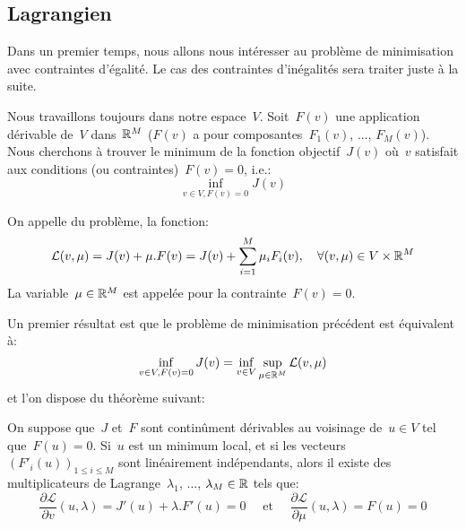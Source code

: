 \medskip
\subsection{Lagrangien}

Dans un premier temps, nous allons nous intéresser au problème de minimisation avec contraintes d'égalité. Le cas des contraintes d'inégalités sera traiter juste à la suite.

\medskip
\begin{definition}
Nous travaillons toujours dans notre espace~$V$.
Soit~$F(v)$ une application dérivable de~$V$ dans~$\mathbb R^M$ ($F(v)$ a pour composantes~$F_1(v)$, ..., $F_M(v)$).
Nous cherchons à trouver le minimum de la fonction objectif~$J(v)$ où~$v$ satisfait aux conditions (ou contraintes)~$F(v)=0$, i.e.:
\begin{equation}\label{Eq-LagEq}
\inf_{v\in V, F(v)=0} J(v)
\end{equation}

On appelle  du problème, la fonction:
\begin{equation}
\mathcal{L}(v,\mu) = J(v)+\mu.F(v) = J(v) + \displaystyle\sum_{i=1}^M \mu_iF_i(v), 
\quad \forall (v,\mu)\in V\times\mathbb R^M
\end{equation}
La variable~$\mu\in\mathbb R^M$ est appelée  pour la contrainte~$F(v)=0$.
\end{definition}

Un premier résultat est que le problème de minimisation précédent est équivalent à:
\begin{equation}
\inf_{v\in V, F(v)=0} J(v) = \inf_{v\in V} \sup_{\mu\in\mathbb R^M} \mathcal{L}(v,\mu)
\end{equation}
et l'on dispose du théorème suivant:
\begin{theoreme}
On suppose que~$J$ et~$F$ sont continûment dérivables au voisinage de~$u\in V$ tel que~$F(u)=0$. Si~$u$ est un minimum local, et si les vecteurs~$(F'_i(u))_{1\le i\le M}$ sont linéairement indépendants, alors il existe des multiplicateurs de Lagrange~$\lambda_1$, ..., $\lambda_M\in\mathbb R$ tels que:
\begin{equation}
\dfrac{\partial\mathcal{L}}{\partial v}(u,\lambda) = J'(u)+\lambda.F'(u)=0
\quad \text{ et }\quad
\dfrac{\partial\mathcal{L}}{\partial \mu}(u,\lambda) = F(u)=0
\end{equation}
\end{theoreme}


